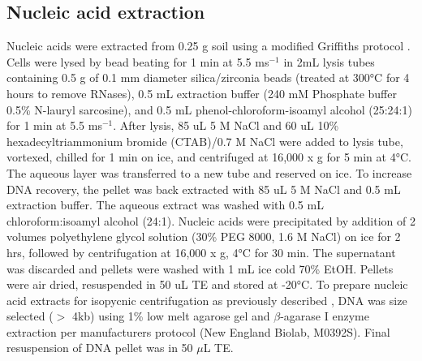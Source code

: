 \documentclass{article}
\begin{document}
\subsection{Nucleic acid extraction}
Nucleic acids were extracted from 0.25 g soil using a modified Griffiths
protocol \citep{Griffiths_2000}. Cells were lysed by bead beating for
1 min at 5.5 ms$^{-1}$ in 2mL lysis tubes containing 0.5 g of 0.1
mm diameter silica/zirconia beads (treated at 300°C for 4 hours to remove
RNases), 0.5 mL extraction buffer (240 mM Phosphate buffer 0.5\% N-lauryl
sarcosine), and 0.5 mL phenol-chloroform-isoamyl alcohol (25:24:1) for 1 min at
5.5 ms$^{-1}$. After lysis, 85 uL 5 M NaCl and 60 uL 10\%
hexadecyltriammonium bromide (CTAB)/0.7 M NaCl were added to lysis tube,
vortexed, chilled for 1 min on ice, and centrifuged at 16,000 x g for 5 min at
4°C. The aqueous layer was transferred to a new tube and reserved on ice. To
increase DNA recovery, the pellet was back extracted with 85 uL 5 M NaCl and
0.5 mL extraction buffer. The aqueous extract was washed with 0.5 mL
chloroform:isoamyl alcohol (24:1). Nucleic acids were precipitated by addition
of 2 volumes polyethylene glycol solution (30\% PEG 8000, 1.6 M NaCl) on ice
for 2 hrs, followed by centrifugation at 16,000 x g, 4°C for 30 min. The
supernatant was discarded and pellets were washed with 1 mL ice cold 70\% EtOH.
Pellets were air dried, resuspended in 50 uL TE and stored at -20°C. To prepare
nucleic acid extracts for isopycnic centrifugation as previously described
\citep{Buckley_2007}, DNA was size selected ($>$ 4kb) using 1\% low melt
agarose gel and $\beta$-agarase I enzyme extraction per manufacturers
protocol (New England Biolab, M0392S).  Final resuspension of DNA pellet
was in 50 $\mu$L TE.   
\end{document}
